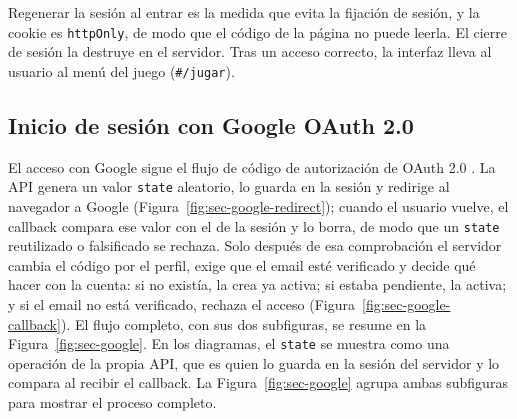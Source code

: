 Regenerar la sesión al entrar es la medida que evita la fijación de sesión, y la cookie es \texttt{httpOnly}, de modo que el código de la página no puede leerla. El cierre de sesión la destruye en el servidor. Tras un acceso correcto, la interfaz lleva al usuario al menú del juego (\texttt{\#/jugar}).

\subsection{Inicio de sesión con Google OAuth 2.0}
\label{sec:flujo-google}

El acceso con Google sigue el flujo de código de autorización de OAuth 2.0 \cite{rfc6749}. La API genera un valor \texttt{state} aleatorio, lo guarda en la sesión y redirige al navegador a Google (Figura~\ref{fig:sec-google-redirect}); cuando el usuario vuelve, el callback compara ese valor con el de la sesión y lo borra, de modo que un \texttt{state} reutilizado o falsificado se rechaza. Solo después de esa comprobación el servidor cambia el código por el perfil, exige que el email esté verificado y decide qué hacer con la cuenta: si no existía, la crea ya activa; si estaba pendiente, la activa; y si el email no está verificado, rechaza el acceso (Figura~\ref{fig:sec-google-callback}). El flujo completo, con sus dos subfiguras, se resume en la Figura~\ref{fig:sec-google}. En los diagramas, el \texttt{state} se muestra como una operación de la propia API, que es quien lo guarda en la sesión del servidor y lo compara al recibir el callback. La Figura~\ref{fig:sec-google} agrupa ambas subfiguras para mostrar el proceso completo.

